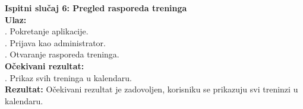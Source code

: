 \documentclass[times, utf8, zavrsni]{fer}
\begin{document}
		\noindent \textbf{Ispitni slučaj 6: Pregled rasporeda treninga}\\
			\textbf{Ulaz:}\\
			    . Pokretanje aplikacije.\\
			    . Prijava kao administrator.\\
			    . Otvaranje rasporeda treninga.\\
			   
			\noindent\textbf{Očekivani rezultat:}\\
			    . Prikaz svih treninga u kalendaru.\\
			    
			\noindent\textbf{Rezultat:}
			    \noindent Očekivani rezultat je zadovoljen, korisniku se prikazuju svi treninzi u kalendaru.
			    
\end{document}
